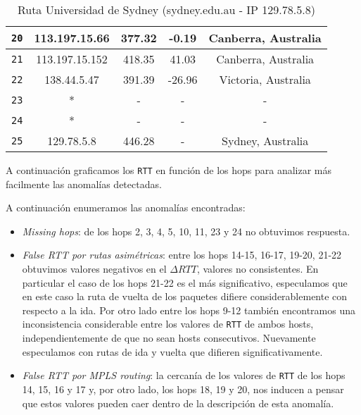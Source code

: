 \begin{table}[H]
\begin{center}
\begin{tabular}{|c|c|c|c|c|}
    \texttt{20} & 113.197.15.66   & 377.32  & -0.19   & Canberra, Australia   \\ \hline
    \texttt{21} & 113.197.15.152  & 418.35  & 41.03   & Canberra, Australia    \\ \hline
    \texttt{22} & 138.44.5.47     & 391.39  & -26.96  & Victoria, Australia   \\ \hline
    \texttt{23} & *               & -       & -       & -                \\ \hline
    \texttt{24} & *               & -       & -       & -   \\ \hline
    \texttt{25} & 129.78.5.8      & 446.28  & -       & Sydney, Australia   \\ \hline
    \end{tabular}
    \caption{Ruta Universidad de Sydney (sydney.edu.au - IP 129.78.5.8)}
\end{center}\end{table}

A continuación graficamos los \texttt{RTT} en función de los hops para analizar más facilmente las anomalías detectadas.

\begin{figure}[H]
    \centering
\end{figure}

A continuación enumeramos las anomalías encontradas:
\begin{itemize}
    \item \textit{Missing hops}: de los hops 2, 3, 4, 5, 10, 11, 23 y 24 no obtuvimos respuesta.
    \item \textit{False RTT por rutas asimétricas}: entre los hops 14-15, 16-17, 19-20, 21-22 obtuvimos valores negativos en el $\Delta RTT$, valores no consistentes. En particular el caso de los hops 21-22 es el más significativo, especulamos que en este caso la ruta de vuelta de los paquetes difiere considerablemente con respecto a la ida. Por otro lado entre los hops 9-12 también encontramos una inconsistencia considerable entre los valores de \texttt{RTT} de ambos hosts, independientemente de que no sean hosts consecutivos. Nuevamente especulamos con rutas de ida y vuelta que difieren significativamente.
    \item \textit{False RTT por MPLS routing}: la cercanía de los valores de \texttt{RTT} de los hops 14, 15, 16 y 17 y, por otro lado, los hops 18, 19 y 20, nos inducen a pensar que estos valores pueden caer dentro de la descripción de esta anomalía.
\end{itemize}

